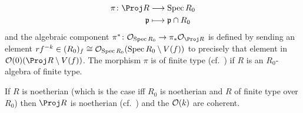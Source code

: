 \documentclass[a4paper,parskip=half,numbers=enddot, DIV=12]{scrreprt}
\begin{document}
\begin{prop}
\begin{alphanumerate}
		\begin{align}\lbl{eq:Proj(R)toSpecR0}
			\begin{split}
				\pi\colon\Proj R&\morphism \Spec R_0\\
				\pp &\longmapsto \pp\cap R_0
			\end{split}
		\end{align}
		and the algebraic component $\pi^*\colon \Oo_{\Spec R_0}\morphism \pi_*\Oo_{\Proj R}$ is defined by sending an element $rf^{-k}\in (R_0)_f\cong \mathcal{O}_{\operatorname{Spec} R_0}(\operatorname{Spec} R_0\setminus V(f))$ to precisely that element in $\Oo(0)(\Proj R\setminus V(f))$. The morphism $\pi$ is of finite type (cf.\ \cite[Definition~2.2.1]{alggeo1}) if $R$ is an $R_0$-algebra of finite type.
		\item If $R$ is noetherian (which is the case iff $R_0$ is noetherian and $R$ of finite type over $R_0$) then $\Proj R$ is noetherian (cf.\ \cite[Definition~2.2.2]{alggeo1}) and the $\mathcal{O}(k)$ are coherent.
	\end{alphanumerate}
\end{prop}
\end{document}
